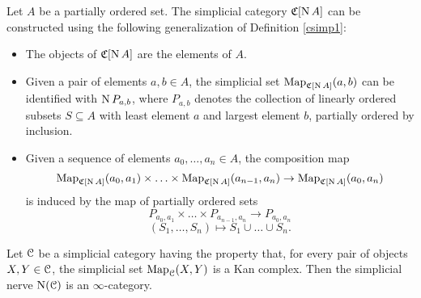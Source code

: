 \begin{example}
Let $A$ be a partially ordered set. The simplicial category $\operatorname{\mathfrak{C}}[\operatorname{N} A]$ can be constructed using the following generalization of Definition \ref{csimp1}:
\begin{itemize}
\item The objects of $\operatorname{\mathfrak{C}}[ \operatorname{N} A]$ are the elements of $A$.
\item Given a pair of elements $a,b \in A$, the simplicial set $\operatorname{{Map}}_{ \operatorname{\mathfrak{C}}[ \operatorname{N} A]}(a,b)$ can be identified with $\operatorname{N} P_{a,b}$, where $P_{a,b}$ denotes the collection of linearly ordered subsets $S \subseteq A$ with least element $a$ and largest element $b$, partially ordered by inclusion.
\item Given a sequence of elements $a_0, \ldots, a_n \in A$, the composition map
$$ \operatorname{{Map}}_{ \operatorname{\mathfrak{C}}[ \operatorname{N} A]}(a_0, a_1) \times \ldots \times \operatorname{{Map}}_{ \operatorname{\mathfrak{C}}[ \operatorname{N} A]}( a_{n-1}, a_n) \rightarrow \operatorname{{Map}}_{ \operatorname{\mathfrak{C}}[ \operatorname{N} A]}(a_0, a_n)$$
is induced by the map of partially ordered sets
$$ P_{a_0, a_1} \times \ldots \times P_{a_{n-1}, a_n} \rightarrow P_{ a_0, a_n}$$
$$ (S_1, \ldots, S_n) \mapsto S_1 \cup \ldots \cup S_n.$$
\end{itemize}
\end{example}

\begin{proposition}\label{toothy}
Let $\operatorname{\mathcal{C}}$ be a simplicial category having the property that, for every pair of objects
$X,Y \in \operatorname{\mathcal{C}}$, the simplicial set $\operatorname{{Map}}_{\operatorname{\mathcal{C}}}(X,Y)$ is a Kan complex. Then the simplicial nerve $\operatorname{N}(\operatorname{\mathcal{C}})$ is an $\infty$-category.
\end{proposition}

